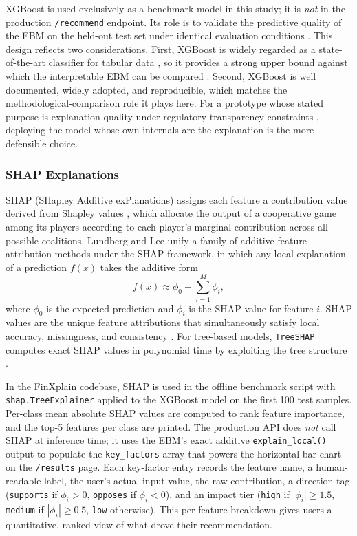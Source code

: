 \documentclass[journal]{./IEEE/IEEEtran}
\begin{document}
XGBoost is used exclusively as a benchmark model in this study; it is \emph{not} in the production \texttt{/recommend} endpoint. Its role is to validate the predictive quality of the EBM on the held-out test set under identical evaluation conditions \cite{ref68}. This design reflects two considerations. First, XGBoost is widely regarded as a state-of-the-art classifier for tabular data \cite{ref16}, so it provides a strong upper bound against which the interpretable EBM can be compared \cite{ref51}. Second, XGBoost is well documented, widely adopted, and reproducible, which matches the methodological-comparison role it plays here. For a prototype whose stated purpose is explanation quality under regulatory transparency constraints \cite{ref44}, deploying the model whose own internals are the explanation is the more defensible choice.

\subsubsection{SHAP Explanations}

SHAP (SHapley Additive exPlanations) assigns each feature a contribution value derived from Shapley values \cite{ref70}, which allocate the output of a cooperative game among its players according to each player's marginal contribution across all possible coalitions. Lundberg and Lee \cite{ref18} unify a family of additive feature-attribution methods under the SHAP framework, in which any local explanation of a prediction $f(x)$ takes the additive form
\begin{equation*}
    f(x) \approx \phi_0 + \sum_{i=1}^{M} \phi_i,
\end{equation*}
where $\phi_0$ is the expected prediction and $\phi_i$ is the SHAP value for feature $i$. SHAP values are the unique feature attributions that simultaneously satisfy local accuracy, missingness, and consistency \cite{ref18}. For tree-based models, \texttt{TreeSHAP} computes exact SHAP values in polynomial time by exploiting the tree structure \cite{ref69}.

In the FinXplain codebase, SHAP is used in the offline benchmark script with \texttt{shap.TreeExplainer} applied to the XGBoost model on the first 100 test samples. Per-class mean absolute SHAP values are computed to rank feature importance, and the top-5 features per class are printed. The production API does \emph{not} call SHAP at inference time; it uses the EBM's exact additive \texttt{explain\_local()} output to populate the \texttt{key\_factors} array that powers the horizontal bar chart on the \texttt{/results} page. Each key-factor entry records the feature name, a human-readable label, the user's actual input value, the raw contribution, a direction tag (\texttt{supports} if $\phi_i > 0$, \texttt{opposes} if $\phi_i < 0$), and an impact tier (\texttt{high} if $|\phi_i| \geq 1.5$, \texttt{medium} if $|\phi_i| \geq 0.5$, \texttt{low} otherwise). This per-feature breakdown gives users a quantitative, ranked view of what drove their recommendation.
\end{document}
